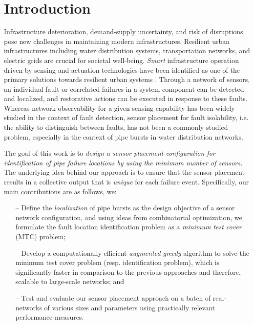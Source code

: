 \documentclass[twocolumn]{autart}
\begin{document}
\section{Introduction}\vspace{-0.35cm}
Infrastructure deterioration, demand-supply uncertainty, and risk of disruptions pose new challenges in maintaining modern infrastructures. Resilient urban infrastructures including water distribution systems, transportation networks, and electric grids are crucial for societal well-being. \textit{Smart} infrastructure operation driven by sensing and actuation technologies have been identified as one of the primary solutions towards resilient urban systems \cite{urbaninfra:edit,6855316}.
Through a network of sensors, an individual fault or correlated failures in a system component can be detected and localized, and restorative actions can be executed in response to these faults.
Whereas network observability for a given sensing capability has been widely studied in the context of fault detection, sensor placement for fault isolability, i.e. the ability to distinguish between faults, has not been a commonly studied problem, especially in the context of pipe bursts in water distribution networks. \vspace{-0.35cm}

The goal of this work is to \textit{design a sensor placement configuration for identification of pipe failure locations by using the minimum number of sensors.} The underlying idea behind our approach is to ensure that the sensor placement results in a collective output that is \textit{unique} for each failure event. 
Specifically, our main contributions are as follows, we: \vspace{-0.25cm}
\begin{itemize}
\item[--] Define the \textit{localization} of pipe bursts as the design objective of a sensor network configuration, and using ideas from combinatorial optimization, we formulate the fault location identification problem as a \textit{minimum test cover} (MTC) problem;
\item[--]Develop a computationally efficient \textit{augmented greedy} algorithm to solve the minimum test cover problem (resp. identification problem), which is significantly faster in comparison to the previous approaches and therefore, scalable to large-scale networks; and
\item[--] Test and evaluate our sensor placement approach on a batch of real-networks of various sizes and parameters using practically relevant performance measures.  
\end{itemize}\vspace{-0.15cm}
\end{document}
